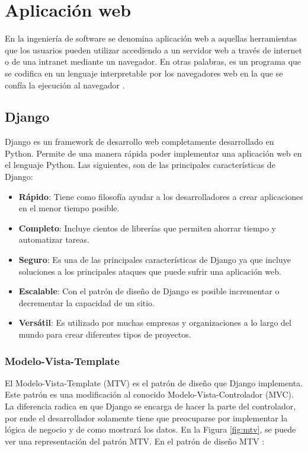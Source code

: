 
\section{Aplicación web}
En la ingeniería de software se denomina aplicación web a aquellas herramientas que los usuarios pueden utilizar accediendo a un servidor web a través de internet o de una intranet mediante un navegador. En otras palabras, es un programa que se codifica en un lenguaje interpretable por los navegadores web en la que se confía la ejecución al navegador \cite{appweb}.

\subsection{Django}
Django es un framework de desarrollo web completamente desarrollado en Python. Permite de una manera rápida poder implementar una aplicación web en el lenguaje Python. Las siguientes, son de las principales características de Django:

\begin{itemize}
    \item \textbf{Rápido}: Tiene como filosofía ayudar a los desarrolladores a crear aplicaciones en el menor tiempo posible.
    \item \textbf{Completo}: Incluye cientos de librerías que permiten ahorrar tiempo y automatizar tareas.
    \item \textbf{Seguro}: Es una de las principales características de Django ya que incluye soluciones a los principales ataques que puede sufrir una aplicación web.
    \item \textbf{Escalable}: Con el patrón de diseño de Django es posible incrementar o decrementar la capacidad de un sitio.
    \item \textbf{Versátil}: Es utilizado por muchas empresas y organizaciones a lo largo del mundo para crear diferentes tipos de proyectos.
\end{itemize}

\subsubsection{Modelo-Vista-Template}
El Modelo-Vista-Template (MTV) es el patrón de diseño que Django implementa. Este patrón es una modificación al conocido Modelo-Vista-Controlador (MVC). La diferencia radica en que Django se encarga de hacer la parte del controlador, por ende el desarrollador solamente tiene que preocuparse por implementar la lógica de negocio y de como mostrará los datos. En la Figura \ref{fig:mtv}, se puede ver una representación del patrón MTV. En el patrón de diseño MTV \cite{mtv}:

